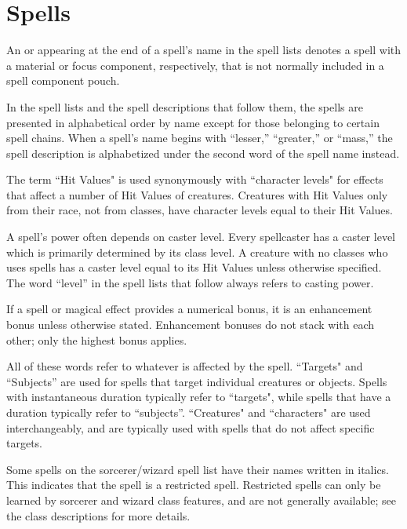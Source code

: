 \chapter{Spells}

An \M{} or \F{} appearing at the end of a spell's name in the spell lists denotes a spell with a material or focus component, respectively, that is not normally included in a spell component pouch.

 In the spell lists and the spell descriptions that follow them, the spells are presented in alphabetical order by name except for those belonging to certain spell chains.
When a spell's name begins with ``lesser,'' ``greater,'' or ``mass,'' the spell description is alphabetized under the second word of the spell name instead.

 The term ``Hit Values" is used synonymously with ``character levels" for effects that affect a number of Hit Values of creatures. Creatures with Hit Values only from their race, not from classes, have character levels equal to their Hit Values.

 A spell's power often depends on caster level. Every spellcaster has a caster level which is primarily determined by its class level. A creature with no classes who uses spells has a caster level equal to its Hit Values unless otherwise specified. The word ``level'' in the spell lists that follow always refers to casting power.

 If a spell or magical effect provides a numerical bonus, it is an enhancement bonus unless otherwise stated. Enhancement bonuses do not stack with each other; only the highest bonus applies.

 All of these words refer to whatever is affected by the spell. ``Targets" and ``Subjects'' are used for spells that target individual creatures or objects. Spells with instantaneous duration typically refer to ``targets", while spells that have a duration typically refer to ``subjects''. ``Creatures" and ``characters" are used interchangeably, and are typically used with spells that do not affect specific targets.

 Some spells on the sorcerer/wizard spell list have their names written in italics. This indicates that the spell is a restricted spell. Restricted spells can only be learned by sorcerer and wizard class features, and are not generally available; see the class descriptions for more details.

